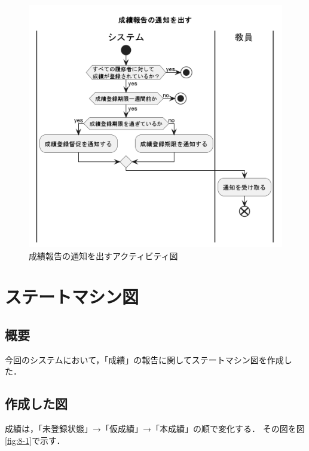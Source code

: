 \documentclass[documentclass]{jsarticle}
\begin{document}
\begin{figure}[H]
  \begin{center}
    \includegraphics*[scale=0.6]{figure/7-7.png}
  \end{center}
  \caption{成績報告の通知を出すアクティビティ図}
  \label{fig:7-7}
\end{figure}
\newpage

\section{ステートマシン図}
\subsection*{概要}
今回のシステムにおいて，「成績」の報告に関してステートマシン図を作成した．


\subsection*{作成した図}
成績は，「未登録状態」→「仮成績」→「本成績」の順で変化する．
その図を図\ref*{fig:8-1}で示す．
\end{document}
